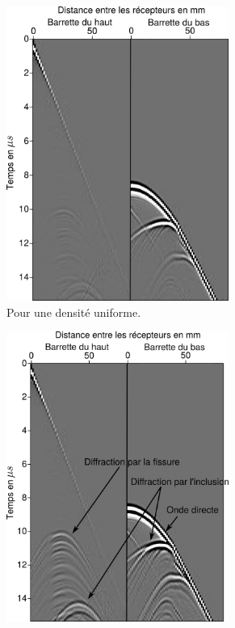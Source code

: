\begin{figure}[!h]
	\centering
	\begin{subfigure}[b]{0.45\textwidth}
		\centering
		\includegraphics[width=0.8\textwidth]{img/rho_sur_donnees/data_rho_uni.png}
		\caption{Pour une densité uniforme.}
	\end{subfigure}
		\begin{subfigure}[b]{0.45\textwidth}
		\centering
		\includegraphics[width=0.8\textwidth]{img/rho_sur_donnees/data_rho_vrai.png}

\end{subfigure}
\end{figure}
